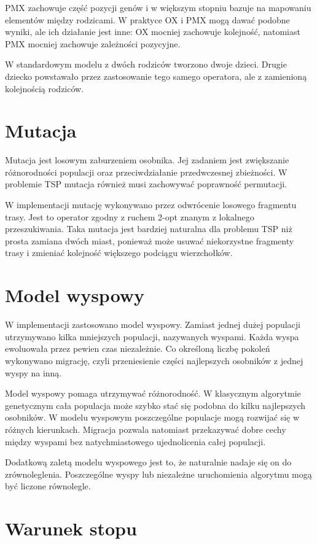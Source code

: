 \documentclass[12pt,a4paper]{article}
\begin{document}
PMX zachowuje część pozycji genów i w większym stopniu bazuje na mapowaniu elementów między rodzicami. W praktyce OX i PMX mogą dawać podobne wyniki, ale ich działanie jest inne: OX mocniej zachowuje kolejność, natomiast PMX mocniej zachowuje zależności pozycyjne.

W standardowym modelu z dwóch rodziców tworzono dwoje dzieci. Drugie dziecko powstawało przez zastosowanie tego samego operatora, ale z zamienioną kolejnością rodziców.

\section{Mutacja}

Mutacja jest losowym zaburzeniem osobnika. Jej zadaniem jest zwiększanie różnorodności populacji oraz przeciwdziałanie przedwczesnej zbieżności. W problemie TSP mutacja również musi zachowywać poprawność permutacji.

W implementacji mutację wykonywano przez odwrócenie losowego fragmentu trasy. Jest to operator zgodny z ruchem 2-opt znanym z lokalnego przeszukiwania. Taka mutacja jest bardziej naturalna dla problemu TSP niż prosta zamiana dwóch miast, ponieważ może usuwać niekorzystne fragmenty trasy i zmieniać kolejność większego podciągu wierzchołków.

\section{Model wyspowy}

W implementacji zastosowano model wyspowy. Zamiast jednej dużej populacji utrzymywano kilka mniejszych populacji, nazywanych wyspami. Każda wyspa ewoluowała przez pewien czas niezależnie. Co określoną liczbę pokoleń wykonywano migrację, czyli przeniesienie części najlepszych osobników z jednej wyspy na inną.

Model wyspowy pomaga utrzymywać różnorodność. W klasycznym algorytmie genetycznym cała populacja może szybko stać się podobna do kilku najlepszych osobników. W modelu wyspowym poszczególne populacje mogą rozwijać się w różnych kierunkach. Migracja pozwala natomiast przekazywać dobre cechy między wyspami bez natychmiastowego ujednolicenia całej populacji.

Dodatkową zaletą modelu wyspowego jest to, że naturalnie nadaje się on do zrównoleglenia. Poszczególne wyspy lub niezależne uruchomienia algorytmu mogą być liczone równolegle.

\section{Warunek stopu}
\end{document}
